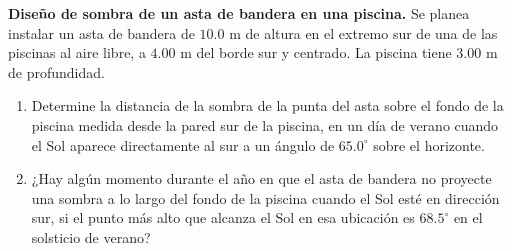 \item \textbf{Diseño de sombra de un asta de bandera en una piscina.}
Se planea instalar un asta de bandera de $10.0\text{ m}$ de altura en el extremo sur de una de las piscinas al aire libre, a $4.00\text{ m}$ del borde sur y centrado. La piscina tiene $3.00\text{ m}$ de profundidad.
\begin{enumerate}
    \item Determine la distancia de la sombra de la punta del asta sobre el fondo de la piscina medida desde la pared sur de la piscina, en un día de verano cuando el Sol aparece directamente al sur a un ángulo de $65.0^\circ$ sobre el horizonte.
    \item ¿Hay algún momento durante el año en que el asta de bandera no proyecte una sombra a lo largo del fondo de la piscina cuando el Sol esté en dirección sur, si el punto más alto que alcanza el Sol en esa ubicación es $68.5^\circ$ en el solsticio de verano?
\end{enumerate}